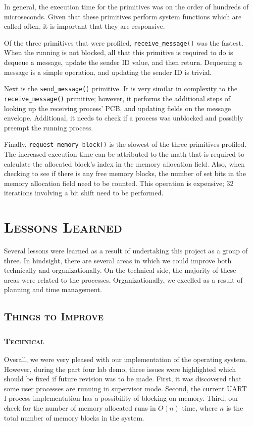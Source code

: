 \documentclass[oneside]{report}
\begin{document}
In general, the execution time for the primitives was on the order of
hundreds of microseconds. Given that these primitives perform system
functions which are called often, it is important that they are responsive.

Of the three primitives that were profiled,
\texttt{receive\_message()} was the fastest. When the running is not
blocked, all that this primitive is required to do is dequeue a
message, update the sender ID value, and then return. Dequeuing a
message is a simple operation, and updating the sender ID is trivial.

Next is the \texttt{send\_message()} primitive. It is very similar in
complexity to the \texttt{receive\_message()} primitive; however, it
performs the additional steps of looking up the receiving process'
PCB, and updating fields on the message envelope. Additional, it needs
to check if a process was unblocked and possibly preempt the running
process.

Finally, \texttt{request\_memory\_block()} is the slowest of the three
primitives profiled. The increased execution time can be attributed to
the math that is required to calculate the allocated block's index in
the memory allocation field. Also, when checking to see if there is
any free memory blocks, the number of set bits in the memory
allocation field need to be counted. This operation is expensive; 32
iterations involving a bit shift need to be performed.

\chapter{\textsc{Lessons Learned}}
Several lessons were learned as a result of undertaking this project as a group
of three. In hindsight, there are several areas in which we could improve both
technically and organizationally. On the technical side, the majority of these
areas were related to the processes. Organizationally, we excelled as a result
of planning and time management.

\section{\textsc{Things to Improve}}

\subsection{\textsc{Technical}}

Overall, we were very pleased with our implementation of the operating system.
However, during the part four lab demo, three issues were highlighted which
should be fixed if future revision was to be made. First, it was discovered
that some user processes are running in supervisor mode. Second, the current
UART I-process implementation has a possibility of blocking on memory. Third, our
check for the number of memory allocated runs in $O(n)$ time, where $n$ is the
total number of memory blocks in the system.
\end{document}
